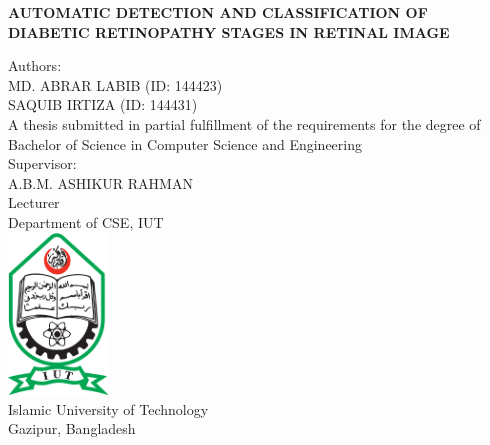 \documentclass[12pt]{report}
\begin{document}
\begin{titlepage}
    \begin{center}
        \vspace*{0.5cm}
        
        \textbf{AUTOMATIC DETECTION AND CLASSIFICATION OF DIABETIC RETINOPATHY STAGES IN RETINAL IMAGE}
        
        
        \normalsize
        \vspace{1.7cm}
        Authors:\\
        MD. ABRAR LABIB (ID: 144423)\\
        SAQUIB IRTIZA (ID: 144431)\\
        
        \vspace{1.0cm}
        A thesis submitted in partial fulfillment of the requirements for the degree of\\
        Bachelor of Science in Computer Science and Engineering\\
        \vspace{1.7cm}
        Supervisor:\\
        A.B.M. ASHIKUR RAHMAN\\
        Lecturer\\
        Department of CSE, IUT\\
        
        \vspace{1.7cm}
		\includegraphics[width=0.2\textwidth]{iut}\\        
        \vspace{0.5cm}
        Islamic University of Technology\\
        Gazipur, Bangladesh\\
        
        
        
        
    \end{center}
\end{titlepage}
\end{document}
